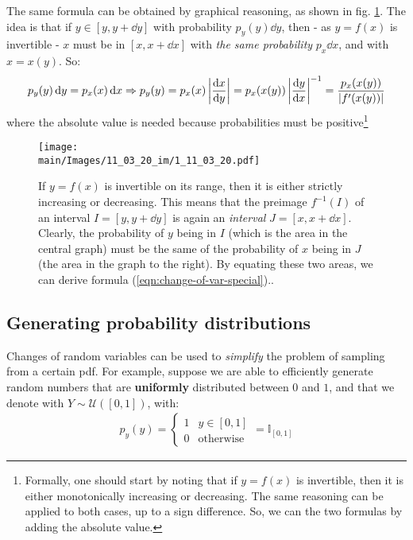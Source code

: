 \documentclass[../../main.tex]{subfiles}
\begin{document}
The same formula can be obtained by graphical reasoning, as shown in fig. \ref{fig:graphical-change}. The idea is that if $y \in [y,y+\dd{y}]$ with probability $p_y(y)\dd{y}$, then - as $y=f(x)$ is invertible - $x$ must be in $[x, x+\dd{x}]$ with \textit{the same probability} $p_x \dd{x}$, and with $x = x(y)$. So:
\begin{align*}
    p_y(y) \dd{y} = p_x(x) \dd{x} \Rightarrow p_y(y) = p_x(x) \left|\dv{x}{y}\right| = p_x(x(y)) \left|\dv{y}{x}\right|^{-1} = \frac{p_x(x(y))}{|f'(x(y))|} 
\end{align*}
where the absolute value is needed because probabilities must be positive\footnote{Formally, one should start by noting that if $y=f(x)$ is invertible, then it is either monotonically increasing or decreasing. The same reasoning can be applied to both cases, up to a sign difference. So, we can  the two formulas by adding the absolute value.}

\begin{figure}[htp]
    \centering
    \texttt{[image: \\main/Images/11\_03\_20\_im/1\_11\_03\_20.pdf]}
    \caption{If $y=f(x)$ is invertible on its range, then it is either strictly increasing or decreasing. This means that the preimage $f^{-1}(I)$ of an interval $I = [y, y+\dd{y}]$ is again an \textit{interval} $J=[x, x+\dd{x}]$. Clearly, the probability of $y$ being in $I$ (which is the area in the central graph) must be the same of the probability of $x$ being in $J$ (the area in the graph to the right). By equating these two areas, we can derive formula (\ref{eqn:change-of-var-special}).\label{fig:graphical-change}.}
\end{figure}

\subsection{Generating probability distributions}
Changes of random variables can be used to \textit{simplify} the problem of sampling from a certain pdf. For example, suppose we are able to efficiently generate random numbers that are \textbf{uniformly} distributed between $0$ and $1$, and that we denote with $Y \sim \mathcal{U}([0,1])$, with:
\begin{align} \label{eqn:unif}
    p_y(y) = \begin{cases}
        1 & y \in [0,1]\\
        0 & \text{otherwise}
    \end{cases} = \mathbb{I}_{[0,1]}
\end{align}
\end{document}
